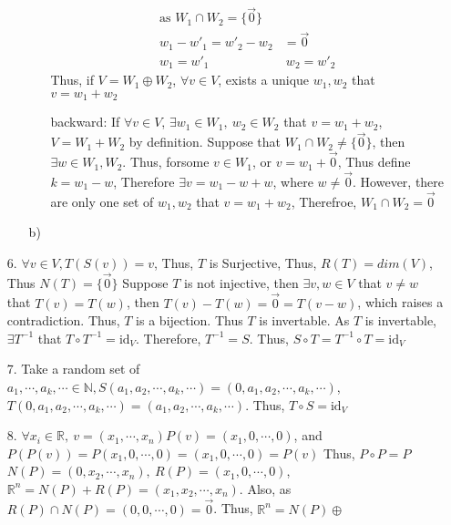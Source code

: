 \documentclass{article}
\begin{document}
\begin{itemize}
\begin{itemize}
\begin{itemize}
\begin{align*}
            \text{as }W_1\cap W_2 = \{\overrightarrow{0}\}\\
            w_1-w'_1=w'_2-w_2&=\overrightarrow{0}\\
            w_1=w'_1\ &\ w_2=w'_2
        \end{align*}
        Thus, if \(V=W_1\oplus W_2\), \(\forall v\in V\), exists a unique \(w_1,w_2\) that \(v = w_1+w_2\)
        \item [backward:] If \(\forall v \in V\), \(\exists w_1\in W_1,\ w_2\in W_2\) that \(v=w_1+w_2\), \(V = W_1+W_2\) by definition. Suppose that \(W_1\cap W_2 \neq \{\overrightarrow{0}\}\), 
        then \(\exists w\in W_1,W_2\). Thus, forsome \(v\in W_1\), or \(v = w_1+\overrightarrow{0}\),  Thus define \(k = w_1-w\), Therefore \(\exists v = w_1-w+w\), where \(w\neq \overrightarrow{0}\). However, there are only one set of \(w_1,w_2\) that \(v=w_1+w_2\), Therefroe, \(W_1\cap W_2 = \overrightarrow{0}\)
    \end{itemize}
    \item [b)]
\end{itemize}
\item [6.]\(\forall v\in V, T(S(v)) = v\), Thus, \(T\) is Surjective, Thus, \(R(T)=dim(V)\), Thus \(N(T)=\{\overrightarrow{0}\}\)
Suppose \(T\) is not injective, then \(\exists v,w \in V\) that \(v\neq w\) that \(T(v)=T(w)\), then \(T(v)-T(w)=\overrightarrow{0}=T(v-w)\), which raises a contradiction. Thus, \(T\) is a bijection. Thus \(T\) is invertable.
As \(T\) is invertable, \(\exists T^{-1}\) that \(T\circ T^{-1} = \text{id}_V\). Therefore, \(T^{-1} = S\). Thus, \(S\circ T = T^{-1}\circ T = \text{id}_V\)
\item [7.] Take a random set of \(a_1,\cdots,a_k,\cdots\in \mathbb{N}, S(a_1,a_2,\cdots,a_k,\cdots)=(0,a_1,a_2,\cdots,a_k,\cdots)\),
            \(T(0,a_1,a_2,\cdots,a_k,\cdots)=(a_1,a_2,\cdots,a_k,\cdots)\). Thus, \(T\circ S = \text{id}_V\)
\item [8.] \(\forall x_i\in\mathbb{R},\ v=(x_1,\cdots,x_n) P(v) = (x_1,0,\cdots,0) \), and \(P(P(v)) = P(x_1,0,\cdots,0) = (x_1,0,\cdots,0) = P(v)\)
Thus, \(P\circ P = P\)\\
\(N(P) = (0,x_2,\cdots,x_n),\ R(P) = (x_1,0,\cdots,0)\), \(\mathbb{R}^n = N(P)+R(P) = (x_1,x_2,\cdots,x_n)\). Also, as \(R(P)\cap N(P) = (0,0,\cdots,0)=\overrightarrow{0}\). Thus, \(\mathbb R ^n = N(P)\oplus \)
\end{itemize}
\end{document}
